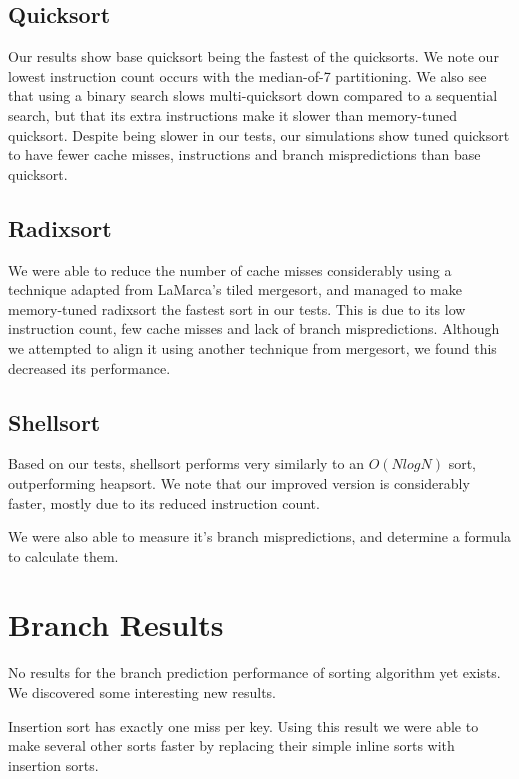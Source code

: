 \subsection{Quicksort}

Our results show base quicksort being the fastest of the quicksorts. We note our
lowest instruction count occurs with the median-of-7 partitioning. We also see
that using a binary search slows multi-quicksort down compared to a sequential
search, but that its extra instructions make it slower than memory-tuned
quicksort.  Despite being slower in our tests, our simulations show tuned
quicksort to have fewer cache misses, instructions and branch mispredictions
than base quicksort.

\subsection{Radixsort}

We were able to reduce the number of cache misses considerably using a technique
adapted from LaMarca's tiled mergesort, and managed to make memory-tuned radixsort the
fastest sort in our tests. This is due to its low instruction count, few cache
misses and lack of branch mispredictions. Although we attempted to align it
using another technique from mergesort, we found this decreased its performance.

\subsection{Shellsort}

Based on our tests, shellsort performs very similarly to an $O(NlogN)$ sort,
outperforming heapsort. We note that our improved version is considerably
faster, mostly due to its reduced instruction count.

We were also able to measure it's branch mispredictions, and determine a formula
to calculate them.

\section{Branch Results}

No results for the branch prediction performance of sorting algorithm yet
exists. We discovered some interesting new results.

Insertion sort has exactly one miss per key. Using this result we were able to
make several other sorts faster by replacing their simple inline sorts with
insertion sorts.

